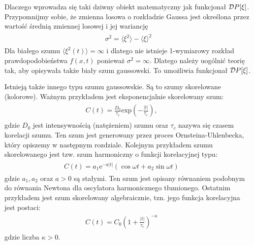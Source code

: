 \documentclass[a4paper,12pt,polish]{sphinxmanual}
\begin{document}
Dlaczego wprowadza się taki dziwny obiekt matematyczny jak funkcjonał ${\cal D}P[\xi]$. Przypomnijmy sobie, że zmienna losowa o rozkładzie Gaussa jest określona przez wartość średnią zmiennej losowej i jej wariancję
\label{ch3/chIII031:equation-eqn9}\begin{gather}
\begin{split}\sigma^2 = \langle\xi^2\rangle-\langle\xi\rangle^{2}\end{split}\label{ch3/chIII031-eqn9}
\end{gather}
Dla białego szumu $\langle \xi^2(t)\rangle = \infty$ i dlatego nie istnieje 1-wymiarowy rozkład prawdopodobieństwa $f(x, t)$ ponieważ $\sigma^2 = \infty$. Dlatego należy uogólnić teorię tak, aby opisywała także biały szum gaussowski. To umożliwia funkcjonał ${\cal D}P[\xi]$.

Istnieją także innego typu szumu gaussowskie. Są to szumy skorelowane (kolorowe). Ważnym przykładem jest eksponencjalnie skorelowany szum:
\label{ch3/chIII031:equation-eqn10}\begin{gather}
\begin{split}C(t)= \frac{D_0}{\tau_c} \mbox{exp}\left( -\frac{|t|}{\tau_c}\right), \qquad\end{split}\label{ch3/chIII031-eqn10}
\end{gather}
gdzie $D_0$ jest intensywnością (natężeniem) szumu oraz $\tau_c$ nazywa się czasem korelacji szumu. Ten szum jest generowany przez proces Ornsteina-Uhlenbecka, który opiszemy w następnym rozdziale. Kolejnym przykładem szumu skorelowanego jest tzw. szum harmoniczny o funkcji korelacyjnej typu:
\label{ch3/chIII031:equation-eqn11}\begin{gather}
\begin{split}C(t)= a_1 \mbox{e}^{-a|t|} \left(\cos \omega t + a_2 \sin \omega t\right) \qquad\end{split}\label{ch3/chIII031-eqn11}
\end{gather}
gdzie $a_1, a_2$ oraz $a>0$ są stałymi. Ten szum jest opisany równaniem podobnym do równania Newtona dla oscylatora harmonicznego tłumionego. Ostatnim przykładem jest szum skorelowany algebraicznie, tzn. jego funkcja korelacyjna jest postaci:
\label{ch3/chIII031:equation-eqn12}\begin{gather}
\begin{split}C(t)= C_0 \left(1+ \frac{|t|}{\tau_c}\right)^{-\kappa} \qquad\end{split}\label{ch3/chIII031-eqn12}
\end{gather}
gdzie liczba $\kappa >0$.
\end{document}
